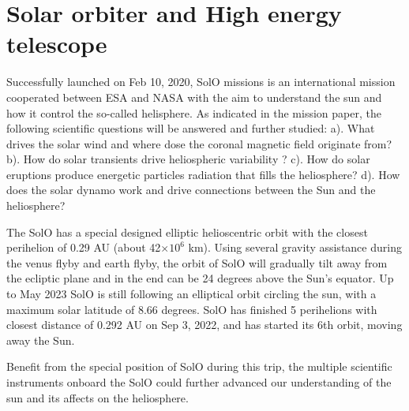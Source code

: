 \section{Solar orbiter and High energy telescope}

Successfully launched on Feb 10, 2020, \ac{SolO} missions \citet{Mueller-2020-SolO} is an international mission cooperated between \ac{ESA} and \ac{NASA} with the aim to understand the sun and how it control the so-called helisphere. As indicated in the mission paper, the following scientific questions will be answered and further studied: a). What drives the solar wind and where dose the coronal magnetic field originate from? b). How do solar transients drive heliospheric variability ? c). How do solar eruptions produce energetic particles radiation that fills the heliosphere? d). How does the solar dynamo work and drive connections between the Sun and the heliosphere?


The \ac{SolO} has a special designed elliptic helioscentric orbit with the closest perihelion of 0.29 AU (about 42$\times10^6$ km). Using several gravity assistance during the venus flyby and earth flyby, the orbit of \ac{SolO} will gradually tilt away from the ecliptic plane and in the end can be 24 degrees above the Sun's equator. Up to May 2023 \ac{SolO} is still following an elliptical orbit circling the sun, with a maximum solar latitude of 8.66 degrees. \ac{SolO} has finished 5 perihelions with closest distance of 0.292 AU on Sep 3, 2022, and has started its 6th orbit, moving away the Sun. 

Benefit from the special position of \ac{SolO} during this trip, the multiple scientific instruments onboard the \ac{SolO} could further advanced our understanding of the sun and its affects on the heliosphere.


